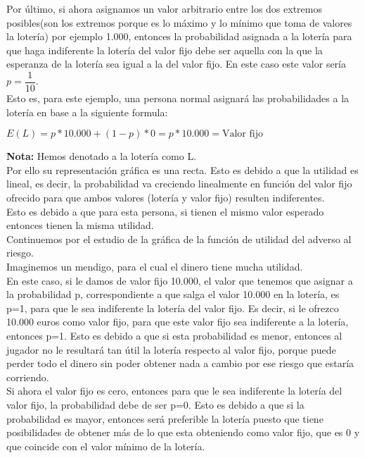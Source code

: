 \documentclass[10pt,a4paper]{book}
\begin{document}
Por último, si ahora asignamos un valor arbitrario entre los dos extremos posibles(son los extremos porque es lo máximo y lo mínimo que toma de valores la lotería) por ejemplo 1.000, entonces la probabilidad asignada a la lotería para que haga indiferente la lotería del valor fijo debe ser aquella con la que la esperanza de la lotería sea igual a la del valor fijo. En este caso este valor sería $p=\dfrac{1}{10}$.\\

Esto es, para este ejemplo, una persona normal asignará las probabilidades a la lotería en base a la siguiente formula:\\

\begin{center}

$E(L)=p*10.000+(1-p)*0=p*10.000 = \mbox{Valor fijo}$

\end{center}

\textbf{Nota:} Hemos denotado a la lotería como L.\\

Por ello su representación gráfica es una recta. Esto es debido a que la utilidad es lineal, es decir, la probabilidad va creciendo linealmente en función del valor fijo ofrecido para que ambos valores (lotería y valor fijo) resulten indiferentes.\\

Esto es debido a que para esta persona, si tienen el mismo valor esperado entonces tienen la misma utilidad.\\

Continuemos por el estudio de la gráfica de la función de utilidad del adverso al riesgo.\\

Imaginemos un mendigo, para el cual el dinero tiene mucha utilidad.\\
En este caso, si le damos de valor fijo 10.000, el valor que tenemos que asignar a la probabilidad p, correspondiente a que salga el valor 10.000 en la lotería, es p=1, para que le sea indiferente la lotería del valor fijo. Es decir, si le ofrezco 10.000 euros como valor fijo, para que este valor fijo sea indiferente a la lotería, entonces p=1. Esto es debido a que si esta probabilidad es menor, entonces al jugador no le resultará tan útil la lotería respecto al valor fijo, porque puede perder todo el dinero sin poder obtener nada a cambio por ese riesgo que estaría corriendo.\\

Si ahora el valor fijo es cero, entonces para que le sea indiferente la lotería del valor fijo, la probabilidad debe de ser p=0. Esto es debido a que si la probabilidad es mayor, entonces será preferible la lotería puesto que tiene posibilidades de obtener más de lo que esta obteniendo como valor fijo, que es 0 y que coincide con el valor mínimo de la lotería.\\
\end{document}

